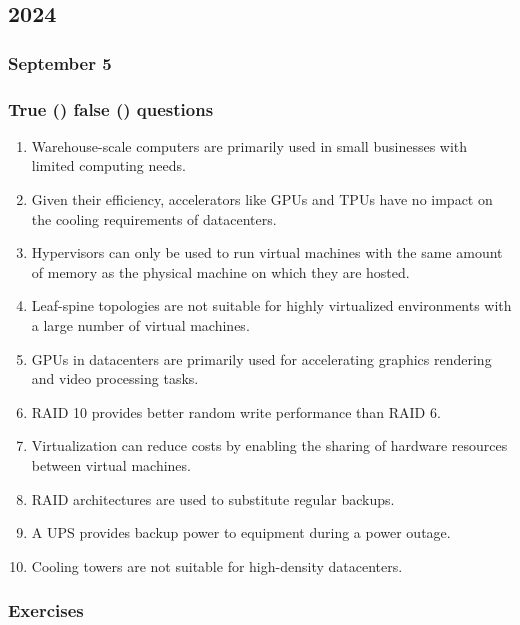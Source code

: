 \subsection{2024}

\subsubsection{September 5}

\subsubsection*{True (\trueIcon) false (\falseIcon) questions}

\begin{enumerate}
    \item \falseIcon \: Warehouse-scale computers are primarily used in small businesses with limited computing needs.
    \item \falseIcon \: Given their efficiency, accelerators like GPUs and TPUs have no impact on the cooling requirements of datacenters.
    \item \falseIcon \: Hypervisors can only be used to run virtual machines with the same amount of memory as the physical machine on which they are hosted.
    \item \falseIcon \: Leaf-spine topologies are not suitable for highly virtualized environments with a large number of virtual machines.
    \item \falseIcon \: GPUs in datacenters are primarily used for accelerating graphics rendering and video processing tasks.
    \item \trueIcon \: RAID 10 provides better random write performance than RAID 6.
    \item \trueIcon \: Virtualization can reduce costs by enabling the sharing of hardware resources between virtual machines.
    \item \falseIcon \: RAID architectures are used to substitute regular backups.
    \item \trueIcon \: A UPS provides backup power to equipment during a power outage.
    \item \falseIcon \: Cooling towers are not suitable for high-density datacenters.
\end{enumerate}

\newpage

\subsubsection*{Exercises}

